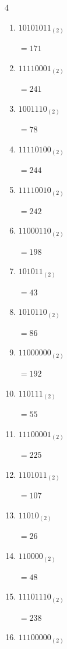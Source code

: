 \begin{multicols}{4}
\begin{enumerate}
        $=29$

  \item $10101011_{(2)}$

        $=171$

  \item $11110001_{(2)}$

        $=241$

\columnbreak %

  \item $1001110_{(2)}$

        $=78$

  \item $11110100_{(2)}$

        $=244$

  \item $11110010_{(2)}$

        $=242$

  \item $11000110_{(2)}$

        $=198$

  \item $101011_{(2)}$

        $=43$

  \item $1010110_{(2)}$

        $=86$

  \item $11000000_{(2)}$

        $=192$

  \item $110111_{(2)}$

        $=55$

  \item $11100001_{(2)}$

        $=225$

  \item $1101011_{(2)}$

        $=107$

  \item $11010_{(2)}$

        $=26$

  \item $110000_{(2)}$

        $=48$

  \item $11101110_{(2)}$

        $=238$

  \item $11100000_{(2)}$


\end{enumerate}
\end{multicols}

